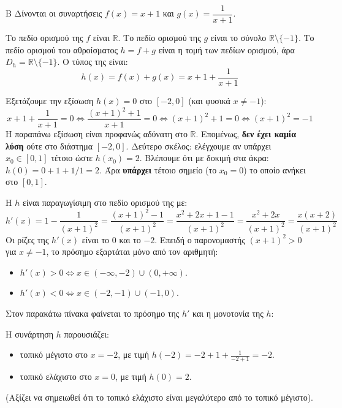\begin{thema}{Β}
Δίνονται οι συναρτήσεις $f(x) = x+1$ και $g(x) = \dfrac{1}{x+1}$.
\begin{erwthma}
\item Το πεδίο ορισμού της $f$ είναι $\mathbb{R}$. Το πεδίο ορισμού της $g$ είναι το σύνολο $\mathbb{R} \setminus \{-1\}$.
Το πεδίο ορισμού του αθροίσματος $h = f + g$ είναι η τομή των πεδίων ορισμού, άρα $D_h = \mathbb{R} \setminus \{-1\}$.
Ο τύπος της είναι:
\[ h(x) = f(x) + g(x) = x + 1 + \frac{1}{x+1} \]

\item Εξετάζουμε την εξίσωση $h(x) = 0$ στο $[-2, 0]$ (και φυσικά $x \ne -1$):
\[ x + 1 + \frac{1}{x+1} = 0 \Leftrightarrow \frac{(x+1)^2 + 1}{x+1} = 0 \Leftrightarrow (x+1)^2 + 1 = 0 \Leftrightarrow (x+1)^2 = -1 \]
Η παραπάνω εξίσωση είναι προφανώς αδύνατη στο $\mathbb{R}$. Επομένως, \textbf{δεν έχει καμία λύση} ούτε στο διάστημα $[-2, 0]$.
Δεύτερο σκέλος: ελέγχουμε αν υπάρχει $x_0 \in [0, 1]$ τέτοιο ώστε $h(x_0)=2$.
Βλέπουμε ότι με δοκιμή στα άκρα:
$h(0) = 0 + 1 + 1/1 = 2$.
Άρα \textbf{υπάρχει} τέτοιο σημείο (το $x_0=0$) το οποίο ανήκει στο $[0, 1]$.

\item Η $h$ είναι παραγωγίσιμη στο πεδίο ορισμού της με:
\[ h'(x) = 1 - \frac{1}{(x+1)^2} = \frac{(x+1)^2 - 1}{(x+1)^2} = \frac{x^2+2x+1-1}{(x+1)^2} = \frac{x^2+2x}{(x+1)^2} = \frac{x(x+2)}{(x+1)^2} \]
Οι ρίζες της $h'(x)$ είναι το $0$ και το $-2$. 
Επειδή ο παρονομαστής $(x+1)^2 > 0$ για $x \ne -1$, το πρόσημο εξαρτάται μόνο από τον αριθμητή:
\begin{itemize}
\item $h'(x) > 0 \Leftrightarrow x \in (-\infty, -2) \cup (0, +\infty)$.
\item $h'(x) < 0 \Leftrightarrow x \in (-2, -1) \cup (-1, 0)$.
\end{itemize}
Στον παρακάτω πίνακα φαίνεται το πρόσημο της $h'$ και η μονοτονία της $h$:
\begin{center}
\end{center}
Η συνάρτηση $h$ παρουσιάζει:
\begin{itemize}
\item τοπικό μέγιστο στο $x = -2$, με τιμή $h(-2) = -2 + 1 + \frac{1}{-2+1} = -2$.
\item τοπικό ελάχιστο στο $x = 0$, με τιμή $h(0) = 2$.
\end{itemize}
(Αξίζει να σημειωθεί ότι το τοπικό ελάχιστο είναι μεγαλύτερο από το τοπικό μέγιστο).


\end{erwthma}
\end{thema}
